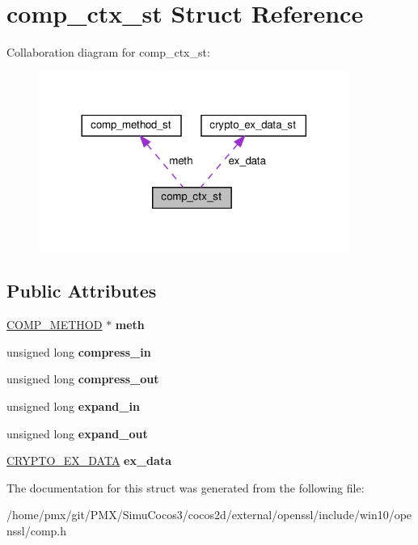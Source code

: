 \hypertarget{structcomp__ctx__st}{}\section{comp\+\_\+ctx\+\_\+st Struct Reference}
\label{structcomp__ctx__st}


Collaboration diagram for comp\+\_\+ctx\+\_\+st\+:
\nopagebreak
\begin{figure}[H]
\begin{center}
\leavevmode
\includegraphics[width=288pt]{structcomp__ctx__st__coll__graph}
\end{center}
\end{figure}
\subsection*{Public Attributes}
\begin{DoxyCompactItemize}
\item 
\mbox{\label{structcomp__ctx__st_accd49b9ff8bafe3fa01c8cadc597b855}} 
\hyperlink{structcomp__method__st}{C\+O\+M\+P\+\_\+\+M\+E\+T\+H\+OD} $\ast$ {\bfseries meth}
\item 
\mbox{\label{structcomp__ctx__st_a4a67c3eda213508177bedaaae237f8c4}} 
unsigned long {\bfseries compress\+\_\+in}
\item 
\mbox{\label{structcomp__ctx__st_a4ad823d6c60afbb5d0951f97b3f2e787}} 
unsigned long {\bfseries compress\+\_\+out}
\item 
\mbox{\label{structcomp__ctx__st_a14c4bacc851d14791e566f11624f9a8e}} 
unsigned long {\bfseries expand\+\_\+in}
\item 
\mbox{\label{structcomp__ctx__st_acddf6014a55ffef5a232046f63d4f8a6}} 
unsigned long {\bfseries expand\+\_\+out}
\item 
\mbox{\label{structcomp__ctx__st_ab5069d63997ca03596aeadb5f03f37ec}} 
\hyperlink{structcrypto__ex__data__st}{C\+R\+Y\+P\+T\+O\+\_\+\+E\+X\+\_\+\+D\+A\+TA} {\bfseries ex\+\_\+data}
\end{DoxyCompactItemize}


The documentation for this struct was generated from the following file\+:\begin{DoxyCompactItemize}
\item 
/home/pmx/git/\+P\+M\+X/\+Simu\+Cocos3/cocos2d/external/openssl/include/win10/openssl/comp.\+h\end{DoxyCompactItemize}
